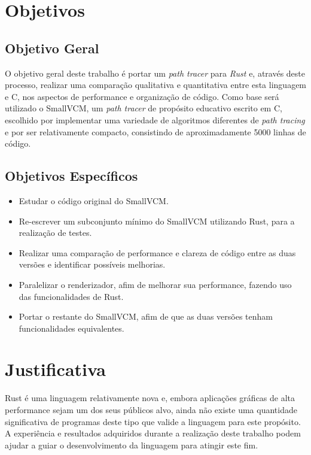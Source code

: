 \documentclass[tg]{mdtufsm}
\def\Cpp{{C\nolinebreak[4]\raisebox{.20ex}{\small\bf++}}}
\begin{document}
\section{Objetivos}

\subsection{Objetivo Geral}

O objetivo geral deste trabalho é portar um \emph{path tracer} para \emph{Rust} e, através deste processo,
realizar uma comparação qualitativa e quantitativa entre esta linguagem e \Cpp, nos aspectos de
performance e organização de código. Como base será utilizado o SmallVCM\citep{smallvcm}, um
\emph{path tracer} de propósito educativo escrito em \Cpp, escolhido por implementar uma variedade
de algoritmos diferentes de \emph{path tracing} e por ser relativamente compacto, consistindo de
aproximadamente 5000 linhas de código.

\subsection{Objetivos Específicos}
\begin{itemize}
	\item Estudar o código original do SmallVCM.
	\item Re-escrever um subconjunto mínimo do SmallVCM utilizando Rust, para a realização de
		testes.
	\item Realizar uma comparação de performance e clareza de código entre as duas versões e
		identificar possíveis melhorias.
	\item Paralelizar o renderizador, afim de melhorar sua performance, fazendo uso das
		funcionalidades de Rust.
	\item Portar o restante do SmallVCM, afim de que as duas versões tenham funcionalidades
		equivalentes.
\end{itemize}

\section{Justificativa}

Rust é uma linguagem relativamente nova e, embora aplicações gráficas de alta performance sejam um
dos seus públicos alvo, ainda não existe uma quantidade significativa de programas deste tipo que
valide a linguagem para este propósito. A experiência e resultados adquiridos durante a realização
deste trabalho podem ajudar a guiar o desenvolvimento da linguagem para atingir este fim.
\end{document}
